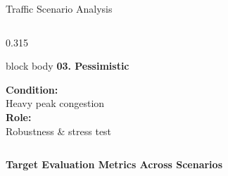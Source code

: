 \documentclass[aspectratio=169,10pt]{beamer}
\begin{document}
\begin{frame}{Traffic Scenario Analysis}
\begin{columns}[T,totalwidth=\textwidth]
\begin{column}{0.315\textwidth}
    \begin{beamercolorbox}[rounded=true,shadow=false,wd=\linewidth,sep=4pt]{block body}
        {\bfseries\color{Primary}\scriptsize 03. Pessimistic}\par\vspace{0.04cm}
        \scriptsize
        \textbf{Condition:}\\
        {\footnotesize Heavy peak congestion}\\[0.08cm]
        \textbf{Role:}\\
        {\footnotesize Robustness \& stress test}
    \end{beamercolorbox}
\end{column}

\end{columns}

\vspace{0.3cm}

\begin{center}
    {\bfseries\scriptsize\color{Primary}Target Evaluation Metrics Across Scenarios}\\[0.12cm]
\end{center}

\end{frame}

\end{document}
